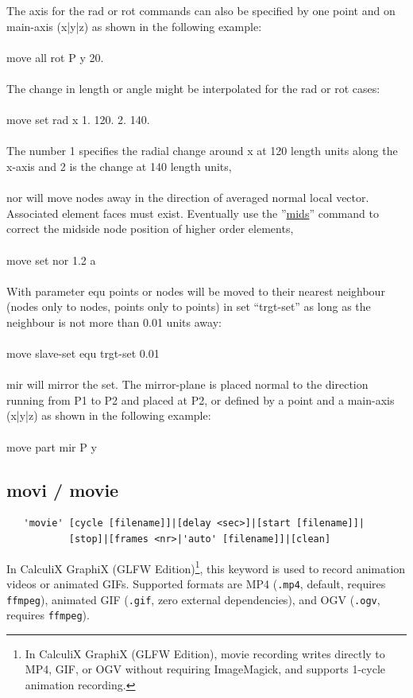 \documentclass{article}
\providecommand{\htmlref}[2]{\hyperref[#2]{#1}}
\begin{document}
The axis for the rad or rot commands can also be specified by one point and on main-axis (x|y|z) as shown in the following example:\\\\
move all rot P y 20.\\\\
The change in length or angle might be interpolated for the rad or rot cases:\\\\
move set rad x 1. 120. 2. 140.\\\\
The number 1 specifies the radial change around x at 120 length units along the x-axis and 2 is the change at 140 length units,\\\\
nor will move nodes away in the direction of averaged normal local vector. Associated element faces must exist. Eventually use the ''\htmlref{mids}{mids}'' command to correct the midside node position of higher order elements,\\\\
move set nor 1.2 a\\\\
With parameter equ points or nodes will be moved to their nearest neighbour (nodes only to nodes, points only to points) in set ``trgt-set'' as long as the neighbour is not more than 0.01 units away:\\\\
move slave-set equ trgt-set 0.01\\\\
mir will mirror the set. The mirror-plane is placed normal to the direction running from P1 to P2 and placed at P2, or defined by a point and a main-axis (x|y|z) as shown in the following example:\\\\
move part mir P y


\subsection{\label{movi}movi / movie}
\begin{verbatim}
   'movie' [cycle [filename]]|[delay <sec>]|[start [filename]]|
           [stop]|[frames <nr>|'auto' [filename]]|[clean]
\end{verbatim}
In CalculiX GraphiX (GLFW Edition)\footnote{In CalculiX GraphiX (GLFW Edition), movie recording writes directly to MP4, GIF, or OGV without requiring ImageMagick, and supports 1-cycle animation recording.}, this keyword is used to record animation videos or animated GIFs. Supported formats are MP4 (\texttt{.mp4}, default, requires \texttt{ffmpeg}), animated GIF (\texttt{.gif}, zero external dependencies), and OGV (\texttt{.ogv}, requires \texttt{ffmpeg}).
\end{document}
